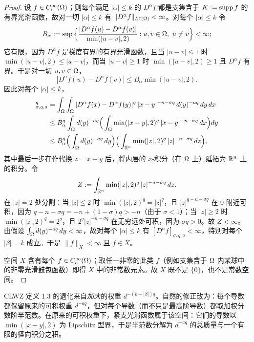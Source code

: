 \begin{proof}
设 $f\in C_c^\infty(\Omega)$；则每个满足 $|\alpha|\le k$ 的 $D^\alpha f$ 都是支集含于 $K:=\operatorname{supp} f$ 的有界光滑函数，故对一切 $|\alpha|\le k$ 有 $\|D^\alpha f\|_{L^q(\Omega)}<\infty$。对每个 $|\alpha|\le k$ 令
\[
  B_\alpha:=\sup\Big\{\frac{|D^\alpha f(u)-D^\alpha f(v)|}{\min(|u-v|,2)} : u,v\in\Omega,\ u\ne v\Big\}<\infty ;
\]
它有限，因为 $D^\alpha f$ 是梯度有界的有界光滑函数，且当 $|u-v|\le1$ 时 $\min(|u-v|,2)\le|u-v|$，而当 $|u-v|\ge1$ 时 $\min(|u-v|,2)\ge1$ 且 $D^\alpha f$ 有界。于是对一切 $u,v\in\Omega$，
\[
  |D^\alpha f(u)-D^\alpha f(v)|\le B_\alpha\min(|u-v|,2).
\]
因此对每个 $|\alpha|\le k$，
\begin{align*}
  [D^\alpha f]^q_{\sigma,q,a}
  &=\int_\Om\int_\Om |D^\alpha f(x)-D^\alpha f(y)|^q\,|x-y|^{-n-\sigma q}\,d(y)^{-aq}\,dy\,dx\\
  &\le B_\alpha^q\int_\Om d(y)^{-aq}\Big(\int_\Om \min(|x-y|,2)^q\,|x-y|^{-n-\sigma q}\,dx\Big)dy\\
  &\le B_\alpha^q\Big(\int_\Om d(y)^{-aq}\,dy\Big)\Big(\int_{\R^n}\min(|z|,2)^q\,|z|^{-n-\sigma q}\,dz\Big),
\end{align*}
其中最后一步在作代换 $z=x-y$ 后，将内层的 $x$-积分（在 $\Omega$ 上）延拓为 $\mathbb{R}^n$ 上的积分。令
\[
  Z:=\int_{\mathbb{R}^n}\min(|z|,2)^q\,|z|^{-n-\sigma q}\,dz .
\]
在 $|z|=2$ 处分割：当 $|z|\le2$ 时 $\min(|z|,2)^q=|z|^q$，且 $|z|^{q-n-\sigma q}$ 在 $0$ 附近可积，因为 $q-n-\sigma q=-n+(1-\sigma)q>-n$（由于 $\sigma<1$）；当 $|z|\ge2$ 时 $\min(|z|,2)^q=2^q$，且 $2^q|z|^{-n-\sigma q}$ 在无穷远处可积，因为 $\sigma q>0$。故 $Z<\infty$。由假设 $\int_\Omega d(y)^{-aq}\,dy<\infty$，故对每个 $|\alpha|\le k$ 有 $[D^\alpha f]_{\sigma,q,a}<\infty$，特别对每个 $|\beta|=k$ 成立。于是 $\|f\|_X<\infty$ 且 $f\in X$。

空间 $X$ 含有每个 $f\in C_c^\infty(\Omega)$；取任一非零的此类 $f$（例如支集含于 $\Omega$ 内某球中的非零光滑鼓包函数）即得 $X$ 中的非常数元素。故 $X$ 既不是 $\{0\}$，也不是常数空间。
\end{proof}

\begin{remark}[直觉]
CLWZ 定义 1.3 的退化来自\emph{加大}的权重 $d^{-(k-|\beta|)q}$。自然的修正改为：每个导数都保留原来的可积权重 $d^{-aq}$，但对每个导数（而不只是最高阶导数）都取加权分数阶半范数。在原来的可积权重下，紧支光滑函数属于该空间：它们的导数以 $\min(|x-y|,2)$ 为 Lipschitz 型界，于是半范数分解为 $d^{-aq}$ 的总质量与一个有限的径向积分之积。
\end{remark}